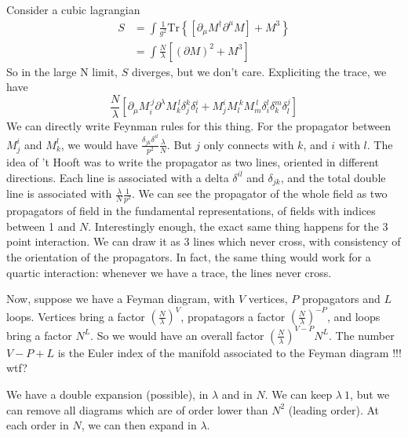 \documentclass[a4paper]{book}
\theoremstyle{definition}
\theoremstyle{remark}
\begin{document}
Consider a cubic lagrangian 
\begin{equation}
    \begin{aligned}
        S &= \int \frac{1}{g^2}\text{Tr}\left\{[\partial_\mu M^\dagger \partial^\mu M] + M^3\right\} \\
        &= \int \frac{N}{\lambda} [(\partial M)^2 + M^3]
    \end{aligned}
\end{equation}
So in the large N limit, $S$ diverges, but we don't care. Expliciting the trace, we have 
\begin{equation}
    \frac{N}{\lambda} \left[\partial_\mu M_i^{~j} \partial^\lambda M_k^{~l}\delta_j^k \delta_l^i + M_j^{i}M_l^{~k} M_m^{~l}\delta_i^l \delta_k^m \delta^j_l\right]
\end{equation}
We can directly write Feynman rules for this thing. For the propagator between $M^i_j$ and $M^l_k$, we would have  $\frac{\delta_{jk}\delta^{il}}{p^2}\frac{\lambda}{N}$. But $j$ only connects with $k$, and $i$ with $l$. The idea of 't Hooft was to write the propagator as two lines, oriented in different directions. Each line is associated with a delta $\delta^{il}$ and $\delta_{jk}$, and the total double line is associated with $\frac{\lambda}{N}\frac{1}{p^2}$. We can see the propagator of the whole field as two propagators of field in the fundamental representations, of fields with indices between 1 and $N$. Interestingly enough, the exact same thing happens for the 3 point interaction. We can draw it as 3 lines which never cross, with consistency of the orientation of the propagators. In fact, the same thing would work for a quartic interaction: whenever we have a trace, the lines never cross. \par \medskip 

Now, suppose we have a Feyman diagram, with $V$ vertices, $P$ propagators and $L$ loops. Vertices bring a factor $\left(\frac{N}{\lambda}\right)^V$, propatagors a factor $\left(\frac{N}{\lambda}\right)^{-P}$, and loops bring a factor $N^L$. So we would have an overall factor $\left(\frac{N}{\lambda}\right)^{V-P}N^L$. The number $V-P+L$ is the Euler index of the manifold associated to the Feyman diagram !!! wtf?\par \medskip 

We have a double expansion (possible), in $\lambda$ and in $N$. We can keep $\lambda ~ 1$, but we can remove all diagrams which are of order lower than $N^2$ (leading order). At each order in $N$, we can then expand in $\lambda$. \par \medskip 
\end{document}
